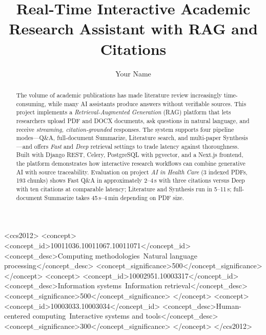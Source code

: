\documentclass[sigplan,review,anonymous]{acmart}
\begin{document}
\title{Real-Time Interactive Academic Research Assistant with RAG and Citations}

\author{Your Name}

\begin{abstract}
The volume of academic publications has made literature review increasingly time-consuming,
while many AI assistants produce answers without verifiable sources.
This project implements a \emph{Retrieval-Augmented Generation} (RAG) platform that lets
researchers upload PDF and DOCX documents, ask questions in natural language, and receive
\emph{streaming, citation-grounded} responses.
The system supports four pipeline modes---Q\&A, full-document Summarize, Literature search,
and multi-paper Synthesis---and offers \emph{Fast} and \emph{Deep} retrieval settings to
trade latency against thoroughness.
Built with Django REST, Celery, PostgreSQL with pgvector, and a Next.js frontend, the
platform demonstrates how interactive research workflows can combine generative AI with
source traceability.
Evaluation on project \emph{AI in Health Care} (3 indexed PDFs, 193 chunks) shows Fast Q\&A
in approximately 2--4\,s with three citations versus Deep with ten citations at comparable
latency; Literature and Synthesis run in 5--11\,s; full-document Summarize takes 45\,s--4\,min
depending on PDF size.
\end{abstract}

\begin{CCSXML}
<ccs2012>
<concept>
<concept_id>10011036.10011067.10011071</concept_id>
<concept_desc>Computing methodologies~Natural language processing</concept_desc>
<concept_significance>500</concept_significance>
</concept>
<concept>
<concept_id>10002951.10003317</concept_id>
<concept_desc>Information systems~Information retrieval</concept_desc>
<concept_significance>500</concept_significance>
</concept>
<concept>
<concept_id>10003033.10003034</concept_id>
<concept_desc>Human-centered computing~Interactive systems and tools</concept_desc>
<concept_significance>300</concept_significance>
</concept>
</ccs2012>
\end{CCSXML}


\end{document}
